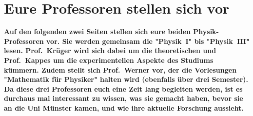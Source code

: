 \section{Eure Professoren stellen sich vor}
\textbf{Auf den folgenden zwei Seiten stellen sich eure beiden Physik-Professoren vor.
	Sie werden gemeinsam die "Physik~I" bis "Physik~III" lesen.
	Prof.\ Krüger wird sich dabei um die theoretischen und Prof.\ Kappes um die experimentellen Aspekte des Studiums kümmern.
	Zudem stellt sich Prof.\ Werner vor, der die Vorlesungen "Mathematik für Physiker" halten wird (ebenfalls über drei Semester).
	Da diese drei Professoren euch eine Zeit lang begleiten werden, ist es durchaus mal interessant zu wissen, was sie gemacht haben, bevor sie an die Uni Münster kamen, und wie ihre aktuelle Forschung aussieht.}

